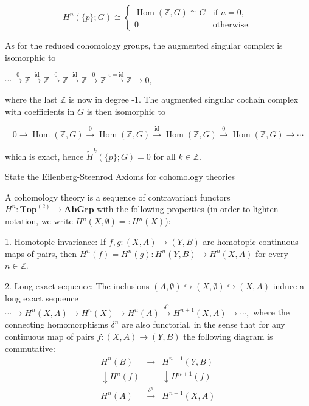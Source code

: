 \[H^n(\{p\}; G) \cong 
\begin{cases}
\operatorname{Hom}(\mathbb{Z}, G) \cong G & \text{if } n = 0, \\
0 & \text{otherwise.}
\end{cases}\]

As for the reduced cohomology groups, the augmented singular complex is isomorphic to

\(\cdots \xrightarrow{0} \mathbb{Z} \xrightarrow{\text{id}} \mathbb{Z} \xrightarrow{0} \mathbb{Z} \xrightarrow{\text{id}} \mathbb{Z} \xrightarrow{0} \mathbb{Z} \xrightarrow{\epsilon = \text{id}} \mathbb{Z} \longrightarrow 0,\)

where the last \(\mathbb{Z}\) is now in degree -1. The augmented singular cochain complex with coefficients in \(G\) is then isomorphic to

\[0 \longrightarrow \operatorname{Hom}(\mathbb{Z}, G) \xrightarrow{0} \operatorname{Hom}(\mathbb{Z}, G) \xrightarrow{\text{id}} \operatorname{Hom}(\mathbb{Z}, G) \xrightarrow{0} \operatorname{Hom}(\mathbb{Z}, G) \longrightarrow \dotsb \]

which is exact, hence \(\tilde{H}^k(\{p\}; G) = 0\) for all \(k \in \mathbb{Z}\).

State the Eilenberg-Steenrod Axioms for cohomology theories

A cohomology theory is a sequence of contravariant functors \(H^n \colon \textbf{Top}^{(2)} \to \textbf{AbGrp}\) 
with the following properties (in order to lighten notation, we write \(H^n(X, \emptyset) =: H^n(X)\)): 

1.  Homotopic invariance: If \(f, g \colon (X, A) \to (Y, B)\) are homotopic continuous maps of pairs, then \(H^n(f) = H^n(g) \colon H^n(Y, B) \to H^n(X, A)\) 
    for every \(n \in \mathbb{Z}\).

2.  Long exact sequence: The inclusions 
    \((A, \emptyset) \hookrightarrow (X, \emptyset) \hookrightarrow (X, A)\)
    induce a long exact sequence
    \(\cdots \longrightarrow H^n(X, A) \longrightarrow H^n(X) \longrightarrow H^n(A) \xrightarrow{\delta^n} H^{n+1}(X, A) \longrightarrow \cdots, \)
    where the connecting homomorphisms \(\delta^n\) are also functorial, in the sense that for any continuous map of pairs \(f \colon (X, A) \to (Y, B)\) 
    the following diagram is commutative:
\[\begin{array}{ccc}
H^n(B) & \longrightarrow & H^{n+1}(Y, B) \\
\downarrow H^n(f) & & \downarrow H^{n+1}(f) \\
H^n(A) & \xrightarrow{\delta^n} & H^{n+1}(X, A)
\end{array}\]

